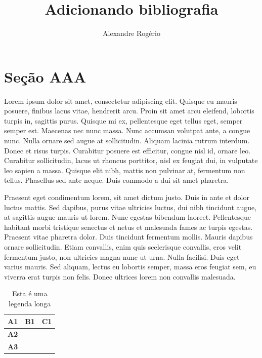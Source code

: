 \documentclass{article}
\begin{document}
	
	\title{\textbf{{\Huge Adicionando bibliografia}}}
	\author{Alexandre Rogério}
	\maketitle
	\thispagestyle{empty} %
	\newpage
	
	\setcounter{page}{1}
	\tableofcontents
	\newpage
	
	\listoffigures
	\newpage
	
	\listoftables
	\newpage
	
	\setcounter{page}{1}
	\section{Seção AAA}
	
	Lorem ipsum dolor sit amet, consectetur adipiscing elit. Quisque eu mauris posuere, finibus lacus vitae, hendrerit arcu. Proin sit amet arcu eleifend, lobortis turpis in, sagittis purus. Quisque mi ex, pellentesque eget tellus eget, semper semper est. Maecenas nec nunc massa. Nunc accumsan volutpat ante, a congue nunc. Nulla ornare sed augue at sollicitudin. Aliquam lacinia rutrum interdum. Donec et risus turpis. Curabitur posuere est efficitur, congue nisl id, ornare leo. Curabitur sollicitudin, lacus ut rhoncus porttitor, nisl ex feugiat dui, in vulputate leo sapien a massa. Quisque elit nibh, mattis non pulvinar at, fermentum non tellus. Phasellus sed ante neque. Duis commodo a dui sit amet pharetra.
	
	
	Praesent eget condimentum lorem, sit amet dictum justo. Duis in ante et dolor luctus mattis. Sed dapibus, purus vitae ultricies luctus, dui nibh tincidunt augue, at sagittis augue mauris ut lorem. Nunc egestas bibendum laoreet. Pellentesque habitant morbi tristique senectus et netus et malesuada fames ac turpis egestas. Praesent vitae pharetra dolor. Duis tincidunt fermentum mollis. Mauris dapibus ornare sollicitudin. Etiam convallis, enim quis scelerisque convallis, eros velit fermentum justo, non ultricies magna nunc ut urna. Nulla facilisi. Duis eget varius mauris. Sed aliquam, lectus eu lobortis semper, massa eros feugiat sem, eu viverra erat turpis non felis. Donec ultrices lorem non convallis malesuada.
	
	\renewcommand{\arraystretch}{1.5}
	\begin{table}[H]
		\centering
		\caption[Legenda curta]{Esta é uma legenda longa}
		\label{tab:tab1}
		\begin{tabular}{|l|l|l|}
			\hline
			\textbf{A1} & \textbf{B1} & \textbf{C1} \\ \hline
			\textbf{A2} &    &    \\ \hline
			\textbf{A3} &    &    \\ \hline
		\end{tabular}
	\end{table}
	
\end{document}
